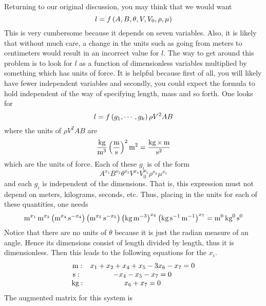 Returning to our original discussion, you may think that we would want 
\begin{equation*}
l=f\left(A,B,\theta ,V,V_{0},\rho ,\mu \right) 
\end{equation*}
This is very cumbersome because it depends on seven variables. Also,
it is likely that without much care, a change in the units such as
going from meters to centimeters would result in an incorrect value
for $l$. The way to get around this problem is to look for $l $ as a
function of dimensionless variables multiplied by something which has
units of force. It is helpful because first of all, you will likely
have fewer independent variables and secondly, you could expect the
formula to hold independent of the way of specifying length, mass and
so forth. One looks for
\begin{equation*}
l=f\left(g_{1},\cdots ,g_{k}\right) \rho V^{2}AB
\end{equation*}
where the units of $\rho V^{2}AB$ are 
\begin{equation*}
\frac{\kg}{\m^{3}}\tup{\frac{\m}{\s }} ^{2}\m^{2}=\frac{\kg\times \m}{%
\s ^{2}}
\end{equation*}
which are the units of force. Each of these $g_{i}$ is of the form 
\begin{equation}
A^{x_{1}}B^{x_{2}}\theta ^{x_{3}}V^{x_{4}}V_{0}^{x_{5}}\rho ^{x_{6}}\mu
^{x_{7}}  \label{11julye1f}
\end{equation}
and each $g_{i}$ is independent of the dimensions. That is, this expression
must not depend on meters, kilograms, seconds, etc. Thus, placing in the
units for each of these quantities, one needs 
\begin{equation*}
\mathop{\textrm{\rm m}}\nolimits^{x_{1}}\mathop{\textrm{\rm m}}\nolimits^{x_{2}}\left(\mathop{\textrm{\rm m}}\nolimits^{x_{4}}\mathop{\textrm{\rm s}}\nolimits ^{-x_{4}}\right) \left(\mathop{\textrm{\rm m}}\nolimits^{x_{5}}\mathop{\textrm{\rm s}}\nolimits
^{-x_{5}}\right) \left(\mathop{\textrm{\rm kg}}\nolimits\mathop{\textrm{\rm m}}\nolimits^{-3}\right) ^{x_{6}}\left(\mathop{\textrm{\rm kg}}\nolimits\mathop{\textrm{\rm s}}\nolimits
^{-1}\mathop{\textrm{\rm m}}\nolimits^{-1}\right) ^{x_{7}}=\mathop{\textrm{\rm m}}\nolimits^{0}\mathop{\textrm{\rm kg}}\nolimits^{0}\mathop{\textrm{\rm s}}\nolimits ^{0}
\end{equation*}
Notice that there are no units of $\theta$ because it is just the radian
measure of an angle. Hence its dimensions consist of length divided by
length, thus it is dimensionless. Then this leads to the following equations
for the $x_{i}.$
\begin{equation*}
\begin{array}{cc}
\m: & x_{1}+x_{2}+x_{4}+x_{5}-3x_{6}-x_{7}=0 \\ 
\s :\  & -x_{4}-x_{5}-x_{7}=0 \\ 
\kg: & x_{6}+x_{7}=0%
\end{array}
\end{equation*}
The augmented matrix for this system is 
